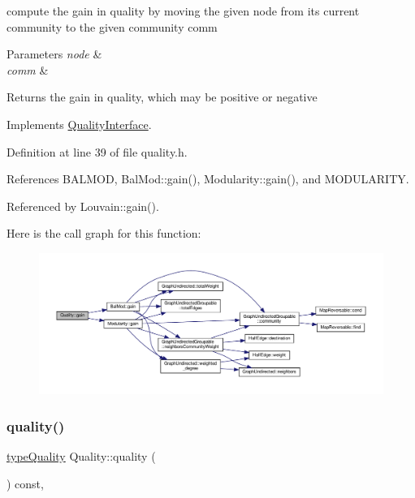 compute the gain in quality by moving the given node from its current community to the given community comm 
\begin{DoxyParams}{Parameters}
{\em node} & \\
\hline
{\em comm} & \\
\hline
\end{DoxyParams}
\begin{DoxyReturn}{Returns}
the gain in quality, which may be positive or negative 
\end{DoxyReturn}


Implements \hyperlink{classQualityInterface_ab6a2e15d118c3945243abb96c7cc0360}{Quality\+Interface}.



Definition at line 39 of file quality.\+h.



References B\+A\+L\+M\+OD, Bal\+Mod\+::gain(), Modularity\+::gain(), and M\+O\+D\+U\+L\+A\+R\+I\+TY.



Referenced by Louvain\+::gain().

Here is the call graph for this function\+:
\nopagebreak
\begin{figure}[H]
\begin{center}
\leavevmode
\includegraphics[width=350pt]{classQuality_a1754dc190ca3204035d873c4d4b580cd_cgraph}
\end{center}
\end{figure}
\mbox{\label{classQuality_a9a6141e9247bc85177f9fe662ec4d14a}} 
\subsubsection{\texorpdfstring{quality()}{quality()}}
{\footnotesize\ttfamily \hyperlink{qualityInterface_8h_a15a3ec6041e6e02d00d2eff22c20fd94}{type\+Quality} Quality\+::quality (\begin{DoxyParamCaption}{ }\end{DoxyParamCaption}) const\hspace{0.3cm}{\ttfamily [inline]}, {\ttfamily [virtual]}}


